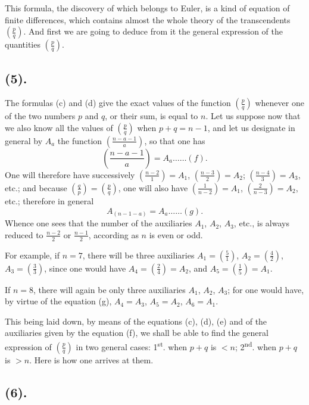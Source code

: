 \documentclass{article}
\begin{document}
This formula, the discovery of which belongs to Euler, is a kind of equation of finite differences, which contains almost the whole theory of the transcendents $\left(\frac{p}{q}\right)$. And first we are going to deduce from it the general expression of the quantities $\left(\frac{p}{q}\right)$.


\subsection*{(5).}

The formulas (c) and (d) give the exact values of the function $\left(\frac{p}{q}\right)$ whenever one of the two numbers $p$ and $q$, or their sum, is equal to $n$. Let us suppose now that we also know all the values of $\left(\frac{p}{q}\right)$ when $p+q=n-1$, and let us designate in general by $A_{a}$ the function $\left(\frac{n-a-1}{a}\right)$, so that one has
\[ \left(\frac{n-a-1}{a}\right)=A_{a}\ldots\ldots(f). \]
One will therefore have successively $\left(\frac{n-2}{1}\right)=A_{1}$, $\left(\frac{n-3}{2}\right)=A_{2}$; $\left(\frac{n-4}{3}\right)=A_{3}$, etc.; and because $\left(\frac{q}{p}\right)=\left(\frac{p}{q}\right)$, one will also have $\left(\frac{1}{n-2}\right)=A_{1}$, $\left(\frac{2}{n-3}\right)=A_{2}$, etc.; therefore in general
\[ A_{(n-1-a)}=A_{a}\ldots\ldots(g). \]
Whence one sees that the number of the auxiliaries $A_{1}$, $A_{2}$, $A_{3}$, etc., is always reduced to $\frac{n-2}{2}$ or $\frac{n-1}{2}$, according as $n$ is even or odd.

For example, if $n=7$, there will be three auxiliaries $A_{1}=\left(\frac{5}{1}\right)$, $A_{2}=\left(\frac{4}{2}\right)$, $A_{3}=\left(\frac{3}{3}\right)$, since one would have $A_{4}=\left(\frac{2}{4}\right)=A_{2}$, and $A_{5}=\left(\frac{1}{5}\right)=A_{1}$.

If $n=8$, there will again be only three auxiliaries $A_{1}$, $A_{2}$, $A_{3}$; for one would have, by virtue of the equation (g), $A_{4}=A_{3}$, $A_{5}=A_{2}$, $A_{6}=A_{1}$.

This being laid down, by means of the equations (c), (d), (e) and of the auxiliaries given by the equation (f), we shall be able to find the general expression of $\left(\frac{p}{q}\right)$ in two general cases: 1\textsuperscript{st}. when $p+q$ is $<n$; 2\textsuperscript{nd}. when $p+q$ is $>n$. Here is how one arrives at them.

\subsection*{(6).}
\end{document}
